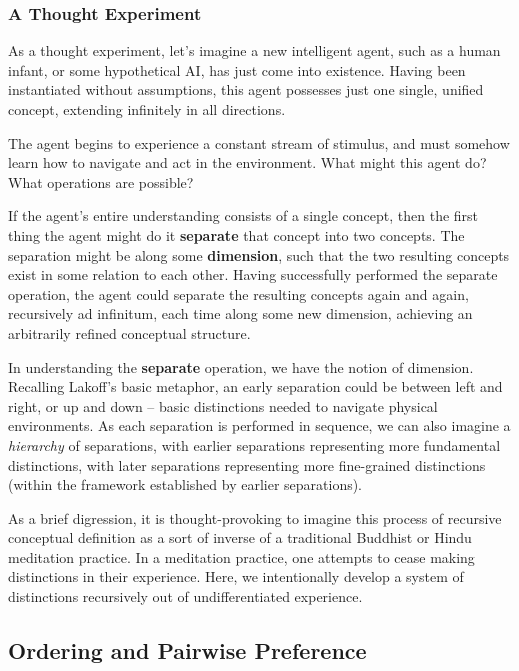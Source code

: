\documentclass[12pt]{book}
\begin{document}
\subsubsection{A Thought Experiment}

As a thought experiment, let's imagine a new intelligent agent, such as a human infant, or some hypothetical AI, has just come into existence.
Having been instantiated without assumptions, this agent possesses just one single, unified concept, extending infinitely in all directions.

The agent begins to experience a constant stream of stimulus, and must somehow learn how to navigate and act in the environment. What might this agent do? What operations are possible?

If the agent's entire understanding consists of a single concept, then the first thing the agent might do it \textbf{separate} that concept into two concepts.
The separation might be along some \textbf{dimension}, such that the two resulting concepts exist in some relation to each other.
Having successfully performed the separate operation, the agent could separate the resulting concepts again and again, recursively ad infinitum, each time along some new dimension, achieving an arbitrarily refined conceptual structure.

In understanding the \textbf{separate} operation, we have the notion of dimension.
Recalling Lakoff's basic metaphor, an early separation could be between left and right, or up and down -- basic distinctions needed to navigate physical environments.
As each separation is performed in sequence, we can also imagine a \textit{hierarchy} of separations, with earlier separations representing more fundamental distinctions, with later separations representing more fine-grained distinctions (within the framework established by earlier separations).

As a brief digression, it is thought-provoking to imagine this process of recursive conceptual definition as a sort of inverse of a traditional Buddhist or Hindu meditation practice.
In a meditation practice, one attempts to cease making distinctions in their experience. Here, we intentionally develop a system of distinctions recursively out of undifferentiated experience.


\subsection{Ordering and Pairwise Preference}
\end{document}
